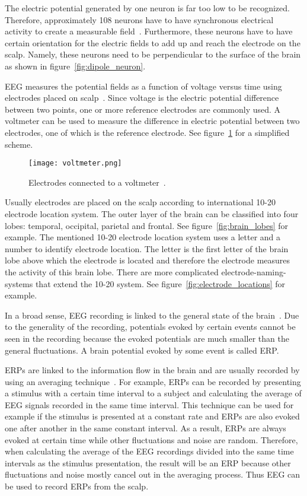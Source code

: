 The electric potential generated by one \gls{neuron} is far too low to be recognized. Therefore, approximately 108 \glspl{neuron} have to have synchronous electrical activity to create a measurable field~\cite{field_count}. Furthermore, these \glspl{neuron} have to have certain orientation for the electric fields to add up and reach the electrode on the scalp. Namely, these neurons need to be perpendicular to the surface of the brain as shown in figure~\ref{fig:dipole_neuron}.

\gls{EEG} measures the potential fields as a function of voltage versus time using electrodes placed on scalp~\cite{field_count}. Since voltage is the electric potential difference between two points, one or more reference electrodes are commonly used. A voltmeter can be used to measure the difference in electric potential between two electrodes, one of which is the reference electrode. See figure~\ref{fig:voltmeter} for a simplified scheme.

\begin{figure}[h!]
	\centering
	\texttt{[image: voltmeter.png]}
	\caption{Electrodes connected to a voltmeter~\cite[p.~120]{ERP}.}
	\label{fig:voltmeter}
\end{figure}

Usually electrodes are placed on the scalp according to international 10-20 electrode location system. The outer layer of the brain can be classified into four lobes: temporal, occipital, parietal and frontal. See figure~\ref{fig:brain_lobes} for example. The mentioned 10-20 electrode location system uses a letter and a number to identify electrode location. The letter is the first letter of the brain lobe above which the electrode is located and therefore the electrode measures the activity of this brain lobe. There are more complicated electrode-naming-systems that extend the 10-20 system. See figure~\ref{fig:electrode_locations} for example.

In a broad sense, \gls{EEG} recording is linked to the general state of the brain~\cite{VEP}. Due to the generality of the recording, potentials evoked by certain events cannot be seen in the recording because the evoked potentials are much smaller than the general fluctuations. A brain potential evoked by some event is called \gls{ERP}. 

\glspl{ERP} are linked to the information flow in the brain and are usually recorded by using an averaging technique~\cite{ERP}. For example, \glspl{ERP} can be recorded by presenting a stimulus with a certain time interval to a subject and calculating the average of \gls{EEG} signals recorded in the same time interval. This technique can be used for example if the stimulus is presented at a constant rate and \glspl{ERP} are also evoked one after another in the same constant interval. As a result, \glspl{ERP} are always evoked at certain time while other fluctuations and noise are random. Therefore, when calculating the average of the \gls{EEG} recordings divided into the same time intervals as the stimulus presentation, the result will be an \gls{ERP} because other fluctuations and noise mostly cancel out in the averaging process. Thus \gls{EEG} can be used to record \glspl{ERP} from the scalp. 

